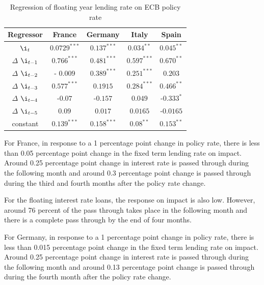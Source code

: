 \documentclass[12pt]{article}
\numberwithin{equation}{section}
\begin{document}
\begin{appendix}
\begin {table}[H]
\begin{center}
\begin{tabular}{||c c c c c||}
		\hline
			
		\end{tabular}
\end{center}
\end {table}




\begin {table}[H]
\caption {Regression of floating year lending rate on ECB policy rate} \label{tab:title} 
\begin{center}
	\begin{tabular}{||c c c c c||} 
		\hline
		Regressor &  France & Germany& Italy & Spain \\ [0.5ex] 
		\hline\hline
		$\i_{t}$ & $0.0729^{***}$& $0.137^{***}$ & $0.034^{**}$& $0.045^{**}$ \\ 
		\hline
		$\Delta$ $\i_{t-1}$& $0.766^{***}$& $0.481^{***}$& $0.597^{***}$& $0.670^{**}$ \\ 
		\hline
		$\Delta$ $\i_{t-2}$&- $0.009$ &$0.389^{***}$& $0.251^{***}$& $0.203$ \\
		
		\hline
		$\Delta$ $\i_{t-3}$	&  $0.577^{***}$ &  $0.1915$& $0.284^{***}$& $0.466^{**}$ \\
		\hline
		$\Delta$  $\i_{t-4}$&-$0.07$&-$0.157$ & $0.049$& -$0.333^{*}$ \\  
		\hline
		$\Delta$  $\i_{t-5}$&$0.09$&$0.017$ & $0.0165$& -$0.0165$ \\  
		\hline
		constant&$0.139^{***}$ &$0.158^{***}$& $0.08^{**}$ & $0.153^{**}$\\ 
		
		\hline
		
	\end{tabular}
\end{center}
\end {table}


For France, in response to a 1 percentage point change in policy rate, there is less than 0.05 percentage point change in the fixed term lending rate on impact. Around 0.25 percentage point change in interest rate is passed through during the following month and around 0.3 percentage point change is passed through during the third and fourth months after the policy rate change.

For the floating interest rate loans, the response on impact is also low. However, around 76 percent of the pass through takes place in the following month and there is a complete pass through by the end of four months.


For Germany, in response to a 1 percentage point change in policy rate, there is less than 0.015 percentage point change in the fixed term lending rate on impact. Around 0.25 percentage point change in interest rate is passed through during the following month and around 0.13 percentage point change is passed through during the fourth month after the policy rate change.


\end{appendix}
\end{document}
